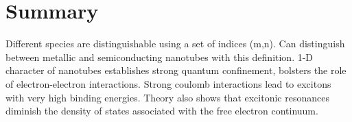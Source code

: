 \section{Summary}

Different species are distinguishable using a set of indices (m,n). Can distinguish between metallic and semiconducting nanotubes with this definition. 1-D character of nanotubes establishes strong quantum confinement, bolsters the role of electron-electron interactions. Strong coulomb interactions lead to excitons with very high binding energies. Theory also shows that excitonic resonances diminish the density of states associated with the free electron continuum. 
